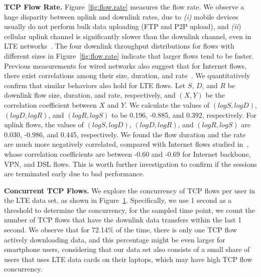 \textbf{TCP Flow Rate.} Figure~\ref{fig:flow.rate} measures the flow rate. We observe a huge disparity between uplink and downlink rates, due to \emph{(i)} mobile devices usually do not perform bulk data uploading (\eg FTP and P2P upload), and \emph{(ii}) cellular uplink channel is significantly slower than the downlink channel, even in LTE networks~\cite{4gbook}.  The four downlink throughput distributions for flows with different sizes in Figure~\ref{fig:flow.rate} indicate that larger flows tend to be faster. Previous measurements for wired networks also suggest that for Internet flows, there exist correlations among their size, duration, and rate~\cite{trat, qian09}. We quantitatively confirm that similar behaviors also hold for LTE flows. Let $S$, $D$, and $R$ be downlink flow size, duration, and rate, respectively, and $(X, Y)$ be the correlation coefficient between $X$ and $Y$. We calculate the values of $(logS, logD)$, $(logD, logR)$, and $(logR, logS)$ to be 0.196, -0.885, and 0.392, respectively. For uplink flows, the values of $(logS, logD)$, $(logD, logR)$, and $(logR, logS)$ are 0.030, -0.986, and 0.445, respectively. We found the flow duration and the rate are much more negatively correlated, compared with Internet flows studied in~\cite{qian09}, whose correlation coefficients are between -0.60 and -0.69 for Internet backbone, VPN, and DSL flows. This is worth further investigation to confirm if the sessions are terminated early due to bad performance.

\textbf{Concurrent TCP Flows.} We explore the concurrency of TCP flows per user in the LTE data set, as shown in Figure~\ref{fig:concurrency}. Specifically, we use 1 second as a threshold to determine the concurrency, \ie for the sampled time point, we count the number of TCP flows that have the downlink data transfers within the last 1 second. We observe that for 72.14\% of the time, there is only one TCP flow actively downloading data, and this percentage might be even larger for smartphone users, considering that our data set also consists of a small share of users that uses LTE data cards on their laptops, which may have high TCP flow concurrency.

\begin{figure}[t]
\centering
{}\\
\label{fig:concurrency}
\end{figure}



